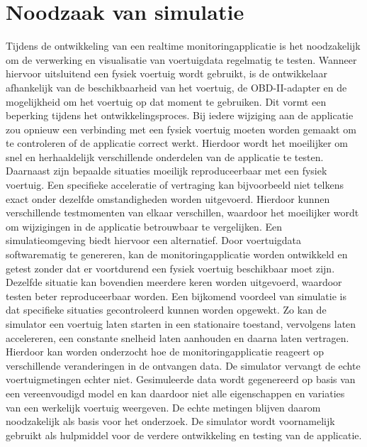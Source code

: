 \section{Noodzaak van simulatie}
Tijdens de ontwikkeling van een realtime monitoringapplicatie is het noodzakelijk om de verwerking en visualisatie van voertuigdata regelmatig te testen. Wanneer hiervoor uitsluitend een fysiek voertuig wordt gebruikt, is de ontwikkelaar afhankelijk van de beschikbaarheid van het voertuig, de OBD-II-adapter en de mogelijkheid om het voertuig op dat moment te gebruiken.
Dit vormt een beperking tijdens het ontwikkelingsproces. Bij iedere wijziging aan de applicatie zou opnieuw een verbinding met een fysiek voertuig moeten worden gemaakt om te controleren of de applicatie correct werkt. Hierdoor wordt het moeilijker om snel en herhaaldelijk verschillende onderdelen van de applicatie te testen.
Daarnaast zijn bepaalde situaties moeilijk reproduceerbaar met een fysiek voertuig. Een specifieke acceleratie of vertraging kan bijvoorbeeld niet telkens exact onder dezelfde omstandigheden worden uitgevoerd. Hierdoor kunnen verschillende testmomenten van elkaar verschillen, waardoor het moeilijker wordt om wijzigingen in de applicatie betrouwbaar te vergelijken.
Een simulatieomgeving biedt hiervoor een alternatief. Door voertuigdata softwarematig te genereren, kan de monitoringapplicatie worden ontwikkeld en getest zonder dat er voortdurend een fysiek voertuig beschikbaar moet zijn. Dezelfde situatie kan bovendien meerdere keren worden uitgevoerd, waardoor testen beter reproduceerbaar worden.
Een bijkomend voordeel van simulatie is dat specifieke situaties gecontroleerd kunnen worden opgewekt. Zo kan de simulator een voertuig laten starten in een stationaire toestand, vervolgens laten accelereren, een constante snelheid laten aanhouden en daarna laten vertragen. Hierdoor kan worden onderzocht hoe de monitoringapplicatie reageert op verschillende veranderingen in de ontvangen data.
De simulator vervangt de echte voertuigmetingen echter niet. Gesimuleerde data wordt gegenereerd op basis van een vereenvoudigd model en kan daardoor niet alle eigenschappen en variaties van een werkelijk voertuig weergeven. De echte metingen blijven daarom noodzakelijk als basis voor het onderzoek. De simulator wordt voornamelijk gebruikt als hulpmiddel voor de verdere ontwikkeling en testing van de applicatie.


